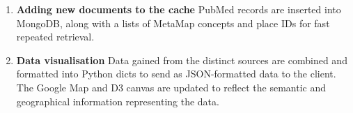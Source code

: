 \documentclass[Report.tex]{subfiles}
\begin{document}
\begin{enumerate}
\item{\textbf{Adding new documents to the cache}}
\newline PubMed records are inserted into MongoDB, along with a lists of MetaMap concepts and place IDs for fast repeated retrieval.
\item{\textbf{Data visualisation}}
\newline Data gained from the distinct sources are combined and formatted into Python dicts to send as JSON-formatted data to the client. The Google Map and D3 canvas are updated to reflect the semantic and geographical information representing the data.
\end{enumerate}
\end{document}
